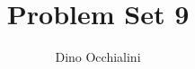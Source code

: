 \documentclass[12pt,a4paper]{article}
\author{Dino Occhialini}
\title{Problem Set 9}
\begin{document}
\maketitle
\begin{flushleft}

  
\end{flushleft}
\end{document}
